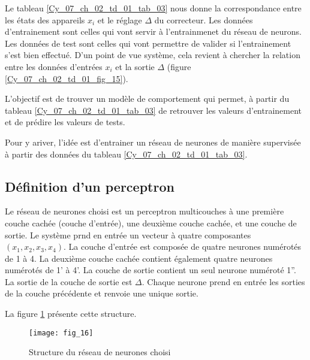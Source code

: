 Le tableau \ref{Cy_07_ch_02_td_01_tab_03} nous donne la correspondance entre les états des appareils $x_i$ et le réglage $\Delta$ du correcteur. Les données d'entrainement sont celles qui vont servir à l'entrainmenet du réseau de neurons. Les données de test sont celles qui vont permettre de valider si l'entrainement s'est bien effectué. D'un point de vue système, cela revient à chercher la relation entre les données d'entrées $x_i$ et la sortie $\Delta$ (figure \ref{Cy_07_ch_02_td_01_fig_15}). 


L'objectif est de trouver un modèle de comportement qui permet, à partir du tableau \ref{Cy_07_ch_02_td_01_tab_03} de retrouver les valeurs d'entrainement et de prédire les valeurs de tests. 

Pour y ariver, l'idée est d'entrainer un réseau de neurones de manière supervisée à partir des données du tableau \ref{Cy_07_ch_02_td_01_tab_03}.

\ifprof
\begin{corrige}
\end{corrige}
\else
\fi

\ifprof
\begin{corrige}
\end{corrige}
\else
\fi


\subsection*{Définition d'un perceptron}

Le réseau de neurones choisi est un perceptron multicouches à une première couche cachée (couche d'entrée), une deuxième couche cachée, et une couche de sortie. Le système prnd en entrée un vecteur à quatre composantes $\left(x_1, x_2, x_3, x_4 \right)$. La couche d'entrée est composée de quatre neurones numérotés de 1 à 4. La deuxième couche cachée contient également quatre neurones numérotés de 1' à 4'. La couche de sortie contient un seul neurone numéroté 1''. La sortie de la couche de sortie est $\Delta$. Chaque neurone prend en entrée les sorties de la couche précédente et renvoie une unique sortie.

La figure \ref{Cy_07_ch_02_td_01_fig_16} présente cette structure. 


\begin{figure}[!h]
\centering
\texttt{[image: fig\_16]}
\caption{Structure du réseau de neurones choisi\label{Cy_07_ch_02_td_01_fig_16}}
\end{figure}

